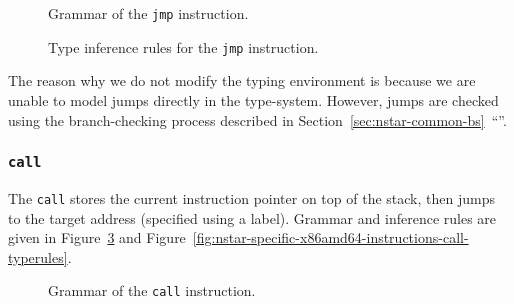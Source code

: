 \begin{figure}[H]
  \centering


  \caption{Grammar of the \texttt{jmp} instruction.}
  \label{fig:nstar-specific-x86amd64-instructions-jmp-grammar}
\end{figure}

\begin{figure}[H]
  \centering

  \begin{prooftree}
  \end{prooftree}

  \caption{Type inference rules for the \texttt{jmp} instruction.}
  \label{fig:nstar-specific-x86amd64-instructions-jmp-typerules}
\end{figure}

The reason why we do not modify the typing environment is because we are unable to model jumps directly in the type-system.
However, jumps are checked using the branch-checking process described in Section~\ref{sec:nstar-common-bs}~``''.

\subsubsection{\texttt{call}}\label{subsubsec:nstar-specific-x86amd64-instructions-call}

The \texttt{call} stores the current instruction pointer on top of the stack, then jumps to the target address (specified using a label).
Grammar and inference rules are given in Figure~\ref{fig:nstar-specific-x86amd64-instructions-call-grammar} and Figure~\ref{fig:nstar-specific-x86amd64-instructions-call-typerules}.

\begin{figure}[H]
  \centering


  \caption{Grammar of the \texttt{call} instruction.}
  \label{fig:nstar-specific-x86amd64-instructions-call-grammar}
\end{figure}

